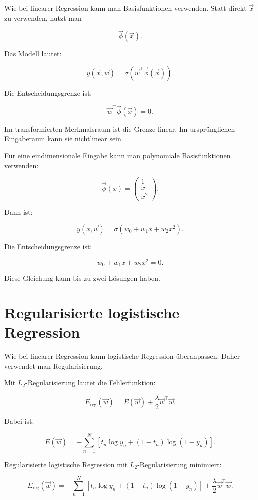 Wie bei linearer Regression kann man Basisfunktionen verwenden.
Statt direkt \(\vec{x}\) zu verwenden, nutzt man

\[
    \vec{\phi}(\vec{x}).
\]

Das Modell lautet:

\[
    y(\vec{x},\vec{w})
    =
    \sigma(\vec{w}^{\top}\vec{\phi}(\vec{x})).
\]

Die Entscheidungsgrenze ist:

\[
    \vec{w}^{\top}\vec{\phi}(\vec{x})=0.
\]

Im transformierten Merkmalsraum ist die Grenze linear.
Im ursprünglichen Eingaberaum kann sie nichtlinear sein.

\begin{examplebox}
Für eine eindimensionale Eingabe kann man polynomiale Basisfunktionen verwenden:

\[
    \vec{\phi}(x)
    =
    \begin{pmatrix}
        1 \\
        x \\
        x^2
    \end{pmatrix}.
\]

Dann ist:

\[
    y(x,\vec{w})
    =
    \sigma(w_0+w_1x+w_2x^2).
\]

Die Entscheidungsgrenze ist:

\[
    w_0+w_1x+w_2x^2=0.
\]

Diese Gleichung kann bis zu zwei Lösungen haben.
\end{examplebox}

\section{Regularisierte logistische Regression}

Wie bei linearer Regression kann logistische Regression überanpassen.
Daher verwendet man Regularisierung.

Mit \(L_2\)-Regularisierung lautet die Fehlerfunktion:

\[
    E_{\mathrm{reg}}(\vec{w})
    =
    E(\vec{w})
    +
    \frac{\lambda}{2}
    \vec{w}^{\top}\vec{w}.
\]

Dabei ist:

\[
    E(\vec{w})
    =
    -\sum_{n=1}^{N}
    \left[
        t_n\log y_n
        +
        (1-t_n)\log(1-y_n)
    \right].
\]

\begin{definitionbox}
Regularisierte logistische Regression mit \(L_2\)-Regularisierung minimiert:

\[
    E_{\mathrm{reg}}(\vec{w})
    =
    -\sum_{n=1}^{N}
    \left[
        t_n\log y_n
        +
        (1-t_n)\log(1-y_n)
    \right]
    +
    \frac{\lambda}{2}
    \vec{w}^{\top}\vec{w}.
\]
\end{definitionbox}

